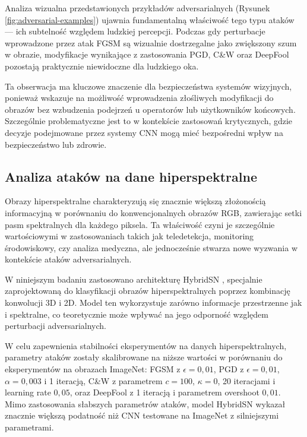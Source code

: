 \documentclass[12pt]{article}
\begin{document}
Analiza wizualna przedstawionych przykładów adversarialnych (Rysunek \ref{fig:adversarial-examples}) ujawnia fundamentalną właściwość tego typu ataków --- ich subtelność względem ludzkiej percepcji. Podczas gdy perturbacje wprowadzone przez atak FGSM są wizualnie dostrzegalne jako zwiększony szum w obrazie, modyfikacje wynikające z zastosowania PGD, C\&W oraz DeepFool pozostają praktycznie niewidoczne dla ludzkiego oka.

Ta obserwacja ma kluczowe znaczenie dla bezpieczeństwa systemów wizyjnych, ponieważ wskazuje na możliwość wprowadzenia złośliwych modyfikacji do obrazów bez wzbudzenia podejrzeń u operatorów lub użytkowników końcowych. Szczególnie problematyczne jest to w kontekście zastosowań krytycznych, gdzie decyzje podejmowane przez systemy CNN mogą mieć bezpośredni wpływ na bezpieczeństwo lub zdrowie.
\subsection{Analiza ataków na dane hiperspektralne}

Obrazy hiperspektralne charakteryzują się znacznie większą złożonością informacyjną w porównaniu do konwencjonalnych obrazów RGB, zawierając setki pasm spektralnych dla każdego piksela. Ta właściwość czyni je szczególnie wartościowymi w zastosowaniach takich jak teledetekcja, monitoring środowiskowy, czy analiza medyczna, ale jednocześnie stwarza nowe wyzwania w kontekście ataków adversarialnych.

W niniejszym badaniu zastosowano architekturę HybridSN \supercite{roy2019hybridsn}, specjalnie zaprojektowaną do klasyfikacji obrazów hiperspektralnych poprzez kombinację konwolucji 3D i 2D. Model ten wykorzystuje zarówno informacje przestrzenne jak i spektralne, co teoretycznie może wpływać na jego odporność względem perturbacji adversarialnych.

W celu zapewnienia stabilności eksperymentów na danych hiperspektralnych, parametry ataków zostały skalibrowane na niższe wartości w porównaniu do eksperymentów na obrazach ImageNet: FGSM z $\epsilon = 0{,}01$, PGD z $\epsilon = 0{,}01$, $\alpha = 0{,}003$ i 1 iteracją, C\&W z parametrem $c = 100$, $\kappa = 0$, 20 iteracjami i learning rate $0{,}05$, oraz DeepFool z 1 iteracją i parametrem overshoot $0{,}01$. Mimo zastosowania słabszych parametrów ataków, model HybridSN wykazał znacznie większą podatność niż CNN testowane na ImageNet z silniejszymi parametrami.
\end{document}
